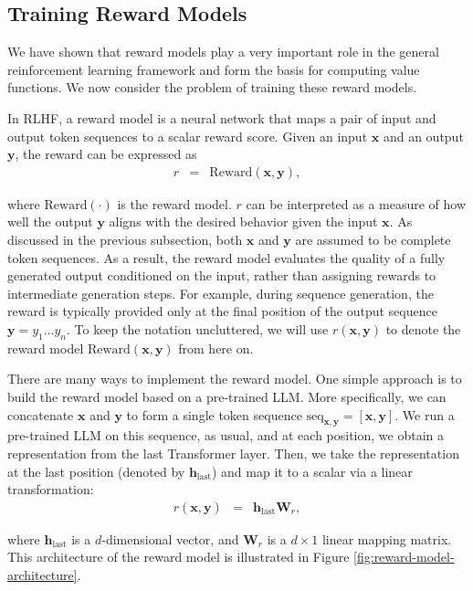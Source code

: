 \subsection{Training Reward Models}
\label{sec:training-reward-models}

\noindent We have shown that reward models play a very important role in the general reinforcement learning framework and form the basis for computing value functions. We now consider the problem of training these reward models.

In RLHF, a reward model is a neural network that maps a pair of input and output token sequences to a scalar reward score. Given an input $\mathbf{x}$ and an output $\mathbf{y}$, the reward can be expressed as
\begin{eqnarray}
r & = & \mathrm{Reward}(\mathbf{x},\mathbf{y}),
\end{eqnarray}

\noindent where $\mathrm{Reward}(\cdot)$ is the reward model. $r$ can be interpreted as a measure of how well the output $\mathbf{y}$ aligns with the desired behavior given the input $\mathbf{x}$. As discussed in the previous subsection, both $\mathbf{x}$ and $\mathbf{y}$ are assumed to be complete token sequences. As a result, the reward model evaluates the quality of a fully generated output conditioned on the input, rather than assigning rewards to intermediate generation steps. For example, during sequence generation, the reward is typically provided only at the final position of the output sequence $\mathbf{y}=y_1...y_n$. To keep the notation uncluttered, we will use $r(\mathbf{x},\mathbf{y})$ to denote the reward model $\mathrm{Reward}(\mathbf{x},\mathbf{y})$ from here on.

There are many ways to implement the reward model. One simple approach is to build the reward model based on a pre-trained LLM. More specifically, we can concatenate $\mathbf{x}$ and $\mathbf{y}$ to form a single token sequence $\mathrm{seq}_{\mathbf{x},\mathbf{y}} = [\mathbf{x}, \mathbf{y}]$. We run a pre-trained LLM on this sequence, as usual, and at each position, we obtain a representation from the last Transformer layer. Then, we take the representation at the last position (denoted by $\mathbf{h}_{\mathrm{last}}$) and map it to a scalar via a linear transformation:
\begin{eqnarray}
r(\mathbf{x},\mathbf{y}) & = & \mathbf{h}_{\mathrm{last}} \mathbf{W}_{r},
\end{eqnarray}

\noindent where $\mathbf{h}_{\mathrm{last}}$ is a $d$-dimensional vector, and $\mathbf{W}_{r}$ is a $d \times 1$ linear mapping matrix. This architecture of the reward model is illustrated in Figure \ref{fig:reward-model-architecture}.

